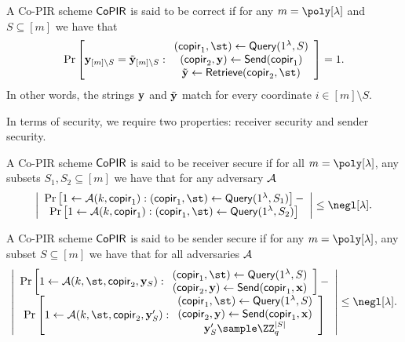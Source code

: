 \begin{definition}[Correctness]
A Co-PIR scheme $\mathsf{CoPIR}$ is said to be correct if for any $m=\poly[\lambda]$ and $S\subseteq [m]$ we have that $$\Pr\left[ \yn_{[m]\setminus S}=\tilde  \yn_{[m]\setminus S}:\begin{array}{c}
     (\copir_1,\st)\leftarrow\query(1^\lambda,S) \\
    (\copir_2,\yn)\leftarrow \send(\copir_1) \\
   \tilde  \yn\leftarrow \retrieve(\copir_2,\st)
\end{array}\right]=1.$$ In other words, the strings $\mathbf{y}$ and $\tilde {\mathbf{y}}$ match for every coordinate $i\in[m]\setminus S$.
\end{definition}

In terms of security, we require two properties: receiver security and sender security.


\begin{definition}
A Co-PIR scheme $\mathsf{CoPIR}$ is said to be receiver secure if for all $m=\poly[\lambda]$, any subsets $S_1,S_2\subseteq[m]$ we have that for any adversary $\mathcal{A}$ $$\left|\begin{array}{c}
      \Pr\left[1\leftarrow\Ac(k,\copir_1):(\copir_1,\st)\leftarrow\query(1^\lambda,S_1) \right]- \\
     \Pr\left[1\leftarrow\Ac(k,\copir_1):(\copir_1,\st)\leftarrow\query(1^\lambda,S_2) \right]
\end{array}\right|\leq \negl[\lambda].$$
\end{definition}



\begin{definition}
A Co-PIR scheme $\mathsf{CoPIR}$ is said to be sender secure if for any $m=\poly[\lambda]$, any subset $S\subseteq[m]$ we have that for all adversaries $\mathcal{A}$ $$\left|
    \begin{array}{c}
         \Pr\left[1\leftarrow\Ac(k,\st,\copir_2,\yn_S):\begin{array}{c}
          (\copir_1,\st)\leftarrow\query(1^\lambda,S)  \\
         (\copir_2,\yn)\leftarrow \send(\copir_1,\xn)  
    \end{array}
    \right]-  \\
          \Pr\left[1\leftarrow\Ac(k,\st,\copir_2, \yn_S'):\begin{array}{c}
          (\copir_1,\st)\leftarrow\query(1^\lambda,S)  \\
         (\copir_2,\yn)\leftarrow \send(\copir_1,\xn)  \\
          \yn_S'\sample \ZZ_q^{|S|}
    \end{array} \right] 
    \end{array}\right|\leq \negl[\lambda].
   $$
\end{definition}



